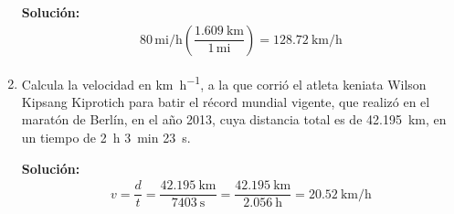 \documentclass[14pt]{extarticle}
\begin{document}
\begin{enumerate}
\textbf{Solución:}
\begin{align*}
80 \, \text{mi}/\unit{\hour} \left( \dfrac{\SI{1.609}{\kilo\meter}}{1 \, \text{mi}} \right) = \SI[per-mode=fraction]{128.72}{\kilo\meter\per\hour}
\end{align*}
\item Calcula la velocidad en \unit{\kilo\meter\per\hour}, a la que corrió el atleta keniata Wilson Kipsang Kiprotich para batir el récord mundial vigente, que realizó en el maratón de Berlín, en el año 2013, cuya distancia total es de \SI{42.195}{\kilo\meter}, en un tiempo de \SI{2}{\hour} \SI{3}{\minute} \SI{23}{\second}.

\textbf{Solución:}
\begin{align*}
v = \dfrac{d}{t} = \dfrac{\SI{42.195}{\kilo\meter}}{\SI{7403}{\second}} = \dfrac{\SI{42.195}{\kilo\meter}}{\SI{2.056}{\hour}} = \SI{20.52}{\kilo\meter\per\hour}
\end{align*}


\end{enumerate}
\end{document}
